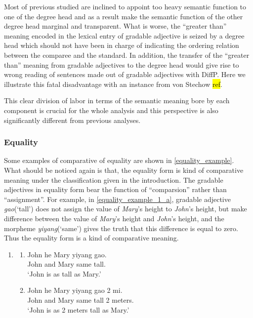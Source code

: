 \documentclass{ctexart}
\begin{document}
Most of  previous studied are inclined to appoint too heavy semantic function to one of the degree head and as a result make the semantic function of the other degree head marginal and transparent. What is worse, the ``greater than'' meaning encoded in the lexical entry of gradable adjective is seized by a degree head which should not have been in charge of indicating the ordering relation between the comparee and the standard. In addition, the transfer of the ``greater than'' meaning from gradable adjectives to the degree head would give rise to  wrong reading of sentences made out of gradable adjectives with DiffP. Here we illustrate this fatal disadvantage with an instance from von Stechow \hl{ref}.

This clear division of labor in terms of the semantic meaning bore by each component is crucial for the whole analysis and this perspective is also significantly different from previous analyses.

\subsubsection{Equality}

Some examples of comparative of equality are shown in \ref{equality_example}. What should be noticed again is that, the equality form is kind of comparative meaning under the classification given in the introduction. The gradable adjectives in equality form bear the function of ``comparsion'' rather than ``assignment''. For example, in \ref{equality_example_1_a}, gradable adjective \textit{gao}(`tall') does not assign the value of \textit{Mary}'s height to \textit{John}'s height, but make difference between the value of \textit{Mary}'s height and \textit{John}'s height, and the morpheme \textit{yiyang}(`same') gives the truth that this difference is equal to zero. Thus the equality form is a kind of comparative meaning.

\begin{enumerate}
    \item \label{equality_example_1}
    \begin{enumerate}
        \item \label{equality_example_1_a}
        John he Mary yiyang gao. \\
        John and Mary same tall. \\
        `John is as tall as Mary.'

        \item \label{equality_example_1_b}
        John he Mary yiyang gao 2 mi. \\
        John and Mary same tall 2 meters. \\
        `John is as 2 meters tall as Mary.'
    \end{enumerate}
\end{enumerate}
\end{document}
